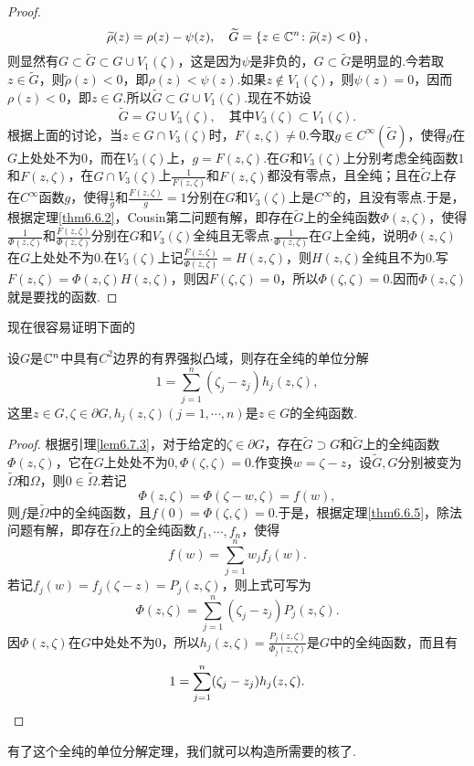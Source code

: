\begin{proof}
	\[\widetilde{\rho}(z)=\rho(z)-\psi(z),\quad\widetilde{G}=\left\{z\in\mathbb C^n\colon\widetilde{\rho}(z)<0\right\},\]
	则显然有$G\subset\widetilde{G}\subset G\cup V_1(\zeta)$，这是因为$\psi$是非负的，$G\subset\widetilde{G}$是明显的.今若取$z\in\widetilde{G}$，则$\widetilde{\rho}(z)<0$，即$\rho(z)<\psi(z)$.如果$z\notin V_1(\zeta)$，则$\psi(z)=0$，因而$\rho(z)<0$，即$z\in G$.所以$\widetilde{G}\subset G\cup V_1(\zeta)$.现在不妨设
	\[\widetilde{G}=G\cup V_3(\zeta),\quad\text{其中$V_3(\zeta)\subset V_1(\zeta)$.}\]
	根据上面的讨论，当$z\in G\cap V_3(\zeta)$时，$F(z,\zeta)\neq0$.今取$g\in C^\infty(\widetilde{G})$，使得$g$在$G$上处处不为$0$，而在$V_3(\zeta)$上，$g=F(z,\zeta)$.在$G$和$V_3(\zeta)$上分别考虑全纯函数$1$和$F(z,\zeta)$，在$G\cap V_3(\zeta)$上$\frac1{F(z,\zeta)}$和$F(z,\zeta)$都没有零点，且全纯；且在$\widetilde{G}$上存在$C^\infty$函数$g$，使得$\frac1 g$和$\frac{F(z,\zeta)}{g}=1$分别在$G$和$V_3(\zeta)$上是$C^\infty$的，且没有零点.于是，根据定理\ref{thm6.6.2}，Cousin第二问题有解，即存在$\widetilde{G}$上的全纯函数$\Phi(z,\zeta)$，使得$\frac1{\Phi(z,\zeta)}$和$\frac{F(z,\zeta)}{\Phi(z,\zeta)}$分别在$G$和$V_3(\zeta)$全纯且无零点.$\frac{1}{\Phi(z,\zeta)}$在$G$上全纯，说明$\Phi(z,\zeta)$在$G$上处处不为$0$.在$V_3(\zeta)$上记$\frac{F(z,\zeta)}{\Phi(z,\zeta)}=H(z,\zeta)$，则$H(z,\zeta)$全纯且不为$0$.写$F(z,\zeta)=\Phi(z,\zeta)H(z,\zeta)$，则因$F(\zeta,\zeta)=0$，所以$\Phi(\zeta,\zeta)=0$.因而$\Phi(z,\zeta)$就是要找的函数.
\end{proof}
现在很容易证明下面的
\begin{theorem}\label{thm6.7.4}
	设$G$是$\mathbb C^n$中具有$C^2$边界的有界强拟凸域，则存在全纯的单位分解
	\[1=\sum_{j=1}^{n}(\zeta_j-z_j)h_j(z,\zeta),\]
	这里$z\in G,\zeta\in\partial G,h_j(z,\zeta)(j=1,\cdots,n)$是$z\in G$的全纯函数.
\end{theorem}
\begin{proof}
	根据引理\ref{lem6.7.3}，对于给定的$\zeta\in\partial G$，存在$\widetilde{G}\supset G$和$\widetilde{G}$上的全纯函数$\Phi(z,\zeta)$，它在$G$上处处不为$0,\Phi(\zeta,\zeta)=0$.作变换$w=\zeta-z$，设$\widetilde{G},G$分别被变为$\widetilde{\Omega}$和$\Omega$，则$0\in\widetilde{\Omega}$.若记
	\[\Phi(z,\zeta)=\Phi(\zeta-w,\zeta)=f(w),\]
	则$f$是$\widetilde{\Omega}$中的全纯函数，且$f(0)=\Phi(\zeta,\zeta)=0$.于是，根据定理\ref{thm6.6.5}，除法问题有解，即存在$\widetilde{\Omega}$上的全纯函数$f_1,\cdots,f_n$，使得
	\[f(w)=\sum_{j=1}^{n}w_jf_j(w).\]
	若记$f_j(w)=f_j(\zeta-z)=P_j(z,\zeta)$，则上式可写为
	\[\Phi(z,\zeta)=\sum_{j=1}^{n}(\zeta_j-z_j)P_j(z,\zeta).\]
	因$\Phi(z,\zeta)$在$G$中处处不为$0$，所以$h_j(z,\zeta)=\frac{P_j(z,\zeta)}{\Phi_j(z,\zeta)}$是$G$中的全纯函数，而且有
	\[1=\sum_{j=1}^{n}(\zeta_j-z_j)h_j(z,\zeta).\qedhere\]
\end{proof}
有了这个全纯的单位分解定理，我们就可以构造所需要的核了.

